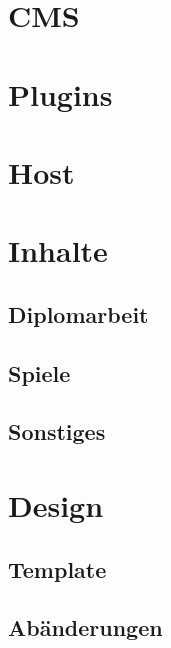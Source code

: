 \section{CMS}
\section{Plugins}
\section{Host}
\section{Inhalte}
    \subsection{Diplomarbeit}
    \subsection{Spiele}
    \subsection{Sonstiges}
\section{Design}
    \subsection{Template}
    \subsection{Abänderungen}